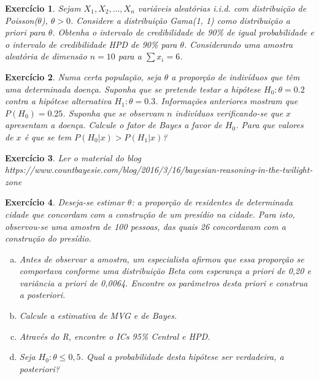 \documentclass[letter,11pt]{article}
\newtheorem{exer}{Exercício}
\begin{document}
\begin{exer} \rm 
Sejam $X_1, X_2,\ldots, X_n$ variáveis aleatórias i.i.d. com distribuição de Poisson($\theta$), $\theta> 0$. Considere a distribuição Gama(1, 1) como distribuição a priori para $\theta$. Obtenha o intervalo de credibilidade de 90\% de igual probabilidade e o intervalo de
credibilidade HPD de 90\% para $\theta$. Considerando uma amostra aleatória
de dimensão $n = 10$ para a $\sum x_i = 6$.
\end{exer}


\begin{exer} \rm 
Numa certa população, seja $\theta$ a proporção de indivíduos que têm uma determinada doença. Suponha que se pretende testar a hipótese $H_0 : \theta = 0.2$ contra a hipótese alternativa $H_1 : \theta = 0.3$. Informações anteriores mostram que $P(H_0) = 0.25$. Suponha que se observam $n$ indivíduos verificando-se que $x$ apresentam a doença.
Calcule o fator de Bayes a favor de $H_0$. Para que valores de $x$ é que se tem $P(H_0 | x) > P(H_1 | x)$?
\end{exer}


\begin{exer} \rm
Ler o material do blog https://www.countbayesie.com/blog/2016/3/16/bayesian-reasoning-in-the-twilight-zone
\end{exer}


\begin{exer} \rm
Deseja-se estimar $\theta$: a proporção de residentes de determinada cidade que concordam com a construção de um presídio na cidade. Para isto, observou-se uma amostra de 100 pessoas, das quais 26 concordavam com a construção do presídio.

\begin{enumerate}[a)]
  \item Antes de observar a amostra, um especialista afirmou que essa proporção se comportava conforme uma distribuição Beta com esperança a priori de 0,20 e variância a \textit{priori} de 0,0064. Encontre os parâmetros desta priori e construa a \textit{posteriori}.
  \item Calcule a estimativa de MVG e de Bayes.
  \item  Através do R, encontre o ICs 95\% Central e HPD.
  \item Seja $H_0 : \theta \leq  0, 5$. Qual a probabilidade desta hipótese ser verdadeira, a \textit{posteriori}?
\end{enumerate}
\end{exer}
\end{document}
